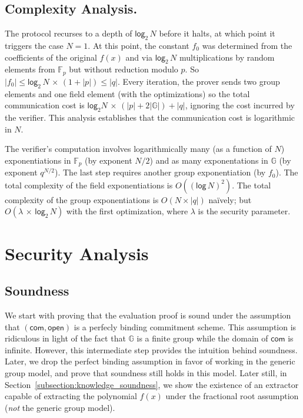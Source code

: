 \documentclass[10pt]{llncs}
\begin{document}
\subsection{Complexity Analysis.}

The protocol recurses to a depth of $\mathsf{log}_2 \, N$ before it halts, at which point it triggers the case $N=1$. At this point, the constant $f_0$ was determined from the coefficients of the original $f(x)$ and via $\mathsf{log}_2 \, N$ multiplications by random elements from $\mathbb{F}_p$ but without reduction modulo $p$. So $|f_0| \leq \mathsf{log}_2 \, N \, \times \, (1 + |p|) \leq |q|$. Every iteration, the prover sends two group elements and one field element (with the optimizations) so the total communication cost is $\mathsf{log}_2 N \, \times \, (|p| + 2 |\mathbb{G}|) + |q|$, ignoring the cost incurred by the verifier. This analysis establishes that the communication cost is logarithmic in $N$.

The verifier's computation involves logarithmically many (as a function of $N$) exponentiations in $\mathbb{F}_p$ (by exponent $N/2$) and as many exponentations in $\mathbb{G}$ (by exponent $q^{N/2}$). The last step requires another group exponentiation (by $f_0$). The total complexity of the field exponentiations is $O((\mathsf{log} \, N)^2)$. The total complexity of the group exponentiations is $O(N \times |q|)$ naïvely; but $O(\lambda \, \times \, \mathsf{log}_2 \, N)$ with the first optimization, where $\lambda$ is the security parameter.

\section{Security Analysis}

\subsection{Soundness} \label{subsection:soundness}
We start with proving that the evaluation proof is sound under the assumption that $(\mathsf{com}, \mathsf{open})$ is a perfecly binding commitment scheme. This assumption is ridiculous in light of the fact that $\mathbb{G}$ is a finite group while the domain of $\mathsf{com}$ is infinite. However, this intermediate step provides the intuition behind soundness. Later, we drop the perfect binding assumption in favor of working in the generic group model, and prove that soundness still holds in this model. Later still, in Section~\ref{subsection:knowledge_soundness}, we show the existence of an extractor capable of extracting the polynomial $f(x)$ under the fractional root assumption (\emph{not} the generic group model).
\end{document}
